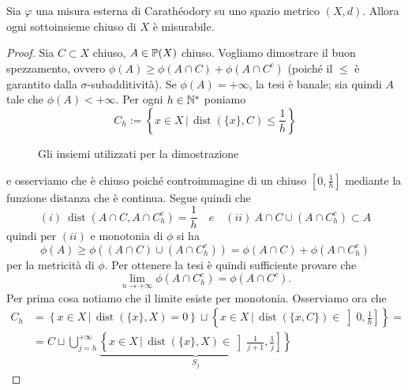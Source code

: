 \begin{shadedTheorem} \label{CARATHEODORY} Sia $\varphi$ una misura esterna di Carathéodory su uno spazio metrico $(X, d)$. Allora ogni sottoinsieme chiuso di $X$ è misurabile.
\end{shadedTheorem}
\begin{proof}
  Sia $C\subset X$ chiuso, $A\in \P(X)$ chiuso. Vogliamo dimostrare il buon spezzamento, ovvero 
  $\phi(A)\geq \phi(A\cap C)+\phi(A\cap C^c)$ (poiché il $\leq$ è garantito dalla $\sigma$-subadditività). Se $\phi(A)=+\infty$, la tesi è banale; sia quindi $A$ tale che $\phi(A)<+\infty$. Per ogni $h\in \N^*$ poniamo \[C_h:=\left\{x\in X\, \bigg|\, \operatorname{dist}(\{x\}, C)\leq \frac{1}{h}\right\}\]
  \begin{figure}[ht]
      \centering
  \caption{Gli insiemi utilizzati per la dimostrazione}
  \end{figure}
  e osserviamo che è chiuso poiché controimmagine di un chiuso $[0, \frac{1}{h}]$ mediante la funzione distanza che è continua. 
  Segue quindi che \[(i)\ \operatorname{dist}(A\cap C, A\cap C^c_h)=\frac{1}{h}\quad e \quad (ii)\ {A\cap C}\cup (A\cap C^c_h)\subset A\]
  quindi per $(ii)$ e monotonia di $\phi$ si ha 
      \[\phi(A)\geq \phi((A\cap C)\cup (A\cap C_h^c))=\phi(A\cap C)+\phi(A\cap C_h^c)\]
  per la metricità di $\phi$. Per ottenere la tesi è quindi sufficiente provare che 
  \[\lim_{n\to+\infty}\phi(A\cap C_h^c)=\phi(A\cap C^c).\]
  Per prima cosa notiamo che il limite esiste per monotonia. Osserviamo ora che 
  \[\begin{aligned}
      C_h & = 
          \left\{x\in X\,|\,\operatorname{dist}(\{x\},X)=0\right\}\sqcup\left\{x\in X\,\bigg|\,\operatorname{dist}(\{x,C\})\in \left]0, \frac{1}{h}\right]\right\} =\\
          & = C \sqcup \bigcup_{j=h}^{+\infty}\underbrace{\left\{x\in X\,\bigg|\, \operatorname{dist}(\{x\},X)\in \left]\frac{1}{j+1}, \frac{1}{j}\right]\right\}}_{S_j}
  \end{aligned}\] 
  

\end{proof}
